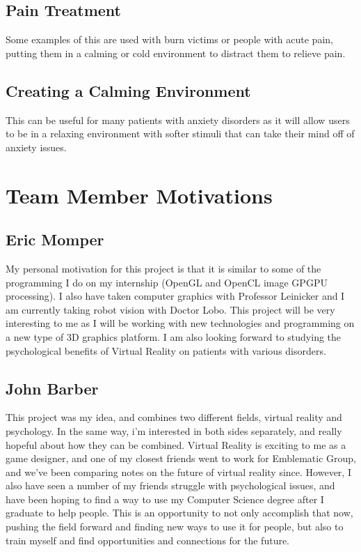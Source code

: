 \documentclass[a4paper,10pt]{article}
\begin{document}
	\subsection{Pain Treatment}
	Some examples of this are used with burn victims or people with acute pain, putting them in a calming or cold environment to distract them to relieve pain.
	\subsection{Creating a Calming Environment}
	This can be useful for many patients with anxiety disorders as it will allow users to be in a relaxing environment with softer stimuli that can take their mind off of anxiety issues. 
	\pagebreak
	
	
	\section{Team Member Motivations}
	\subsection{Eric Momper}
	My personal motivation for this project is that it is similar to some of the programming I do on my internship (OpenGL and OpenCL image GPGPU processing).
	I also have taken computer graphics with Professor Leinicker and I am currently taking robot vision with Doctor Lobo. This project will be very interesting to me as  
	I will be working with new technologies and programming on a new type of 3D graphics platform. I am also looking forward to studying the psychological benefits
	of Virtual Reality on patients with various disorders.  
	
	\subsection{John Barber}
	This project was my idea, and combines two different fields, virtual reality and psychology.  In the same way, i'm interested in both 
	sides separately, and really hopeful about how they can be combined.  Virtual Reality is exciting to me as a game designer, 
	and one of my closest friends went to work for Emblematic Group, and we've been comparing notes on the future of virtual reality since.  
	However, I also have seen a number of my friends struggle with psychological issues, and have been hoping to find a way to use my Computer 
	Science degree after I graduate to help people.  This is an opportunity to not only accomplish that now, pushing the field forward and finding 
	new ways to use it for people, but also to train myself and find opportunities and connections for the future.
\end{document}
